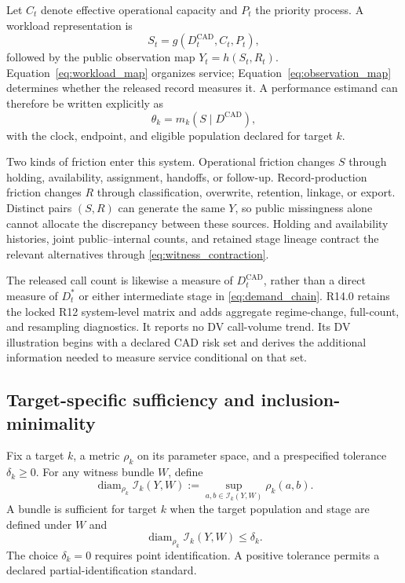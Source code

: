 \documentclass[11pt]{article}
\begin{document}
Let $C_t$ denote effective operational capacity and $P_t$ the priority process. A workload representation is
\begin{equation}
S_t=g(D_t^{\mathrm{CAD}},C_t,P_t),
\label{eq:workload_map}
\end{equation}
followed by the public observation map $Y_t=h(S_t,R_t)$. Equation~\eqref{eq:workload_map} organizes service; Equation~\eqref{eq:observation_map} determines whether the released record measures it. A performance estimand can therefore be written explicitly as
\begin{equation}
\theta_k=m_k\!\left(S\mid D^{\mathrm{CAD}}\right),
\label{eq:conditional_performance}
\end{equation}
with the clock, endpoint, and eligible population declared for target $k$.

Two kinds of friction enter this system. Operational friction changes $S$ through holding, availability, assignment, handoffs, or follow-up. Record-production friction changes $R$ through classification, overwrite, retention, linkage, or export. Distinct pairs $(S,R)$ can generate the same $Y$, so public missingness alone cannot allocate the discrepancy between these sources. Holding and availability histories, joint public--internal counts, and retained stage lineage contract the relevant alternatives through \cref{eq:witness_contraction}.

The released call count is likewise a measure of $D_t^{\mathrm{CAD}}$, rather than a direct measure of $D_t^*$ or either intermediate stage in \cref{eq:demand_chain}. R14.0 retains the locked R12 system-level matrix and adds aggregate regime-change, full-count, and resampling diagnostics. It reports no DV call-volume trend. Its DV illustration begins with a declared CAD risk set and derives the additional information needed to measure service conditional on that set.

\subsection{Target-specific sufficiency and inclusion-minimality}
\label{sec:witness_minimality}

Fix a target $k$, a metric $\rho_k$ on its parameter space, and a prespecified tolerance $\delta_k\ge 0$. For any witness bundle $W$, define
\begin{equation}
\operatorname{diam}_{\rho_k}\mathcal I_k(Y,W)
:=
\sup_{a,b\in\mathcal I_k(Y,W)}\rho_k(a,b).
\label{eq:identified_diameter}
\end{equation}
A bundle is sufficient for target $k$ when the target population and stage are defined under $W$ and
\begin{equation}
\operatorname{diam}_{\rho_k}\mathcal I_k(Y,W)\le\delta_k.
\label{eq:witness_sufficiency}
\end{equation}
The choice $\delta_k=0$ requires point identification. A positive tolerance permits a declared partial-identification standard.
\end{document}
